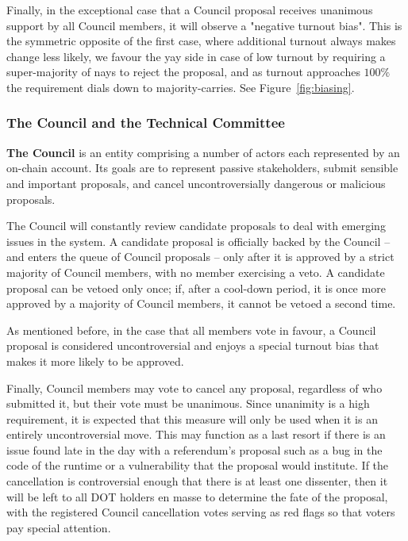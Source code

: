 \documentclass{article}
\begin{document}

Finally, in the exceptional case that a Council proposal receives unanimous support by all Council members, it will observe a "negative turnout bias". This is the symmetric opposite of the first case, where additional turnout always makes change less likely, we favour the yay side in case of low turnout by requiring a super-majority of nays to reject the proposal, and as turnout approaches $100\%$ the requirement dials down to majority-carries. See Figure~\ref{fig:biasing}.


\subsubsection{The Council and the Technical Committee}\label{s:council}

\textbf{The Council} is an entity comprising a number of actors each represented by an on-chain account. Its goals are to represent passive stakeholders, submit sensible and important proposals, and cancel uncontroversially dangerous or malicious proposals.

The Council will constantly review candidate proposals to deal with emerging issues in the system. A candidate proposal is officially backed by the Council -- and enters the queue of Council proposals -- only after it is approved by a strict majority of Council members, with no member exercising a veto. A candidate proposal can be vetoed only once; if, after a cool-down period, it is once more approved by a majority of Council members, it cannot be vetoed a second time. 


As mentioned before, in the case that all members vote in favour, a Council proposal is considered uncontroversial and enjoys a special turnout bias that makes it more likely to be approved. 

Finally, Council members may vote to cancel any proposal, regardless of who submitted it, but their vote must be unanimous. Since unanimity is a high requirement, it is expected that this measure will only be used when it is an entirely uncontroversial move. This may function as a last resort if there is an issue found late in the day with a referendum's proposal such as a bug in the code of the runtime or a vulnerability  that the proposal would institute. If the cancellation is controversial enough that there is at least one dissenter, then it will be left to all DOT holders en masse to determine the fate of the proposal, with the registered Council cancellation votes serving as red flags so that voters pay special attention.
\end{document}
